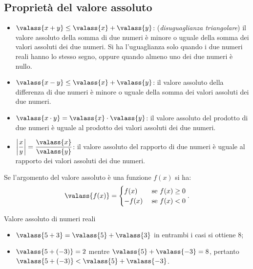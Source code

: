 \subsection{Proprietà del valore assoluto}
\begin{itemize}
 \item $\valass{x+y}\le \valass{x}+\valass{y}$: (\emph{disuguaglianza triangolare}) il valore assoluto della somma di due numeri è minore o uguale della somma dei valori assoluti dei due numeri. Si ha l'uguaglianza solo quando i due numeri reali hanno lo stesso segno, oppure quando almeno uno dei due numeri è nullo.

 \item $\valass{x-y}\le \valass{x}+\valass{y}$: il valore assoluto della differenza di due numeri è minore o uguale della somma dei valori assoluti dei due numeri.

 \item $\valass{x\cdot y}=\valass{x}\cdot \valass{y}$: il valore assoluto del prodotto di due numeri
è uguale al prodotto dei valori assoluti dei due numeri.

 \item $\left |{\dfrac{x}{y}}\right|=\dfrac{\valass{x}}{\valass{y}}$: il valore assoluto del rapporto di due
numeri è uguale al rapporto dei valori assoluti dei due numeri.
\end{itemize}

Se l'argomento del valore assoluto è una funzione $f(x)$ si ha:
\[\valass{f(x)}=
\begin{cases}
f(x) & \text{ se }f(x)\ge 0\\
-f(x) & \text{ se }f(x)<0
\end{cases}.\]
\pagebreak
\begin{exrig}
 \begin{esempio}
 Valore assoluto di numeri reali
 \begin{itemize}
 \item $\valass{5+3}=\valass{5}+\valass{3}$ in entrambi i casi si ottiene $8$;
 \item $\valass{5+(-3)}=2$ mentre $\valass{5}+\valass{-3}=8$, pertanto $\valass{5+(-3)}<\valass{5}+\valass{-3}$.
 \end{itemize}
 \end{esempio}
\end{exrig}

